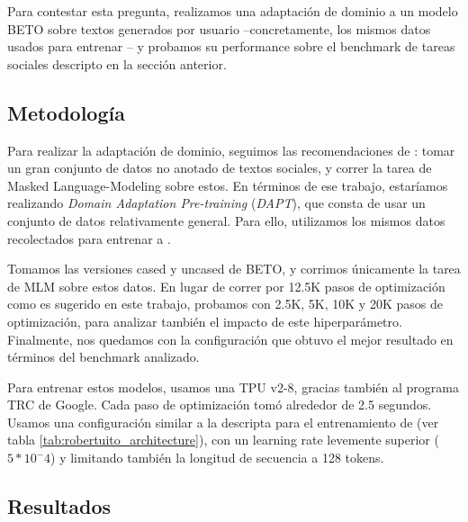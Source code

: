 Para contestar esta pregunta, realizamos una adaptación de dominio a un modelo BETO sobre textos generados por usuario --concretamente, los mismos datos usados para entrenar \robertuito{}-- y probamos su performance sobre el benchmark de tareas sociales descripto en la sección anterior.


\subsection{Metodología}

Para realizar la adaptación de dominio, seguimos las recomendaciones de \citet{gururangan-etal-2020-dont}: tomar un gran conjunto de datos no anotado de textos sociales, y correr la tarea de Masked Language-Modeling sobre estos. En términos de ese trabajo, estaríamos realizando \emph{Domain Adaptation Pre-training} (\emph{DAPT}), que consta de usar un conjunto de datos relativamente general. Para ello, utilizamos los mismos datos recolectados para entrenar a \robertuito{}.

Tomamos las versiones cased y uncased de BETO, y corrimos únicamente la tarea de MLM sobre estos datos. En lugar de correr por 12.5K pasos de optimización como es sugerido en este trabajo, probamos con 2.5K, 5K, 10K y 20K pasos de optimización, para analizar también el impacto de este hiperparámetro. Finalmente, nos quedamos con la configuración que obtuvo el mejor resultado en términos del benchmark analizado.

Para entrenar estos modelos, usamos una TPU v2-8, gracias también al programa TRC de Google. Cada paso de optimización tomó alrededor de 2.5 segundos. Usamos una configuración similar a la descripta para el entrenamiento de \robertuito{} (ver tabla \ref{tab:robertuito_architecture}), con un learning rate levemente superior ($5 * 10^-4$) y limitando también la longitud de secuencia a 128 tokens.

\subsection{Resultados}
\label{sec:domain_adaptation_results}


